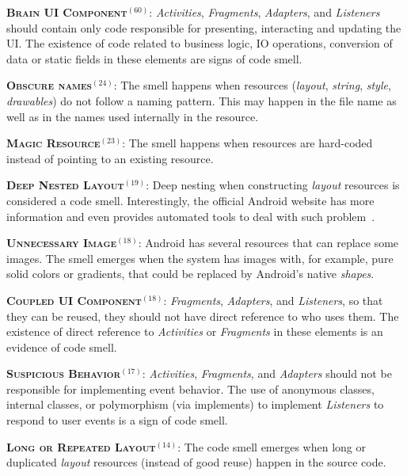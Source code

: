 \noindent
\textsc{\textbf{{\small Brain UI Component}}}$^{(60)}$: \textit{Activities}, \textit{Fragments}, \textit{Adapters}, and \textit{Listeners} should contain only code responsible for presenting, interacting and updating the UI. The existence of code related to business logic, IO operations, conversion of data or static fields in these elements are signs of code smell.


\noindent
\textbf{\textsc{{\small Obscure names}}}$^{(24)}$:
The smell happens when resources (\textit{layout}, \textit{string}, \textit{style}, \textit{drawables}) do not follow a naming pattern. This may happen in the file name as well as in the names used internally in the resource. 


\noindent
\textbf{\textsc{{\small Magic Resource}}}$^{(23)}$:
The smell happens when resources are hard-coded instead of pointing
to an existing resource.


\noindent
\textbf{\textsc{{\small Deep Nested Layout}}}$^{(19)}$:
Deep nesting when constructing \textit{layout} resources is considered 
a code smell. Interestingly, the official Android website has more
information and even provides automated tools to deal with such
problem~\cite{OptmizingViewHierarchies}.

\noindent
\textbf{\textsc{{\small Unnecessary Image}}}$^{(18)}$:
Android has several resources that can replace some images. The smell
emerges when the system has images with, for example, 
pure solid colors or gradients, that could be replaced by
Android's native \textit{shapes}.

\noindent
\textbf{\textsc{{\small Coupled UI Component}}}$^{(18)}$: \textit{Fragments}, \textit{Adapters}, and \textit{Listeners}, so that they can be reused, they should not have direct reference to who uses them. The existence of direct reference to \textit{Activities} or \textit{Fragments} in these elements is an evidence of code smell.

\noindent
\textsc{\textbf{{\small Suspicious Behavior}}}$^{(17)}$: \textit{Activities}, \textit{Fragments}, and \textit{Adapters} should not be responsible for implementing event behavior. The use of anonymous classes, internal classes, or polymorphism (via implements) to implement \textit{Listeners} to respond to user events is a sign of code smell.
 

\noindent
\textbf{\textsc{{\small Long or Repeated Layout}}}$^{(14)}$:
The code smell emerges when 
long or duplicated \textit{layout} resources (instead of good reuse) 
happen in the source code.



